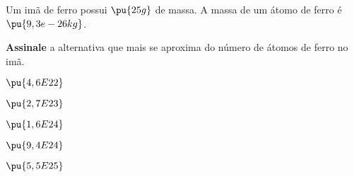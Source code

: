 \begin{problem}[
    id = 1A01,
]

Um imã de ferro possui \(\pu{25 g}\) de massa. A massa de um átomo de ferro é \(\pu{9,3e-26 kg}\).

\textbf{Assinale} a alternativa que mais se aproxima do número de átomos de ferro no imã.

\begin{choices}
    \item \(\pu{4,6E22}\)
    \item \(\pu{2,7E23}\)
    \item \(\pu{1,6E24}\)
    \item \(\pu{9,4E24}\)
    \item \(\pu{5,5E25}\)
\end{choices}

\end{problem}